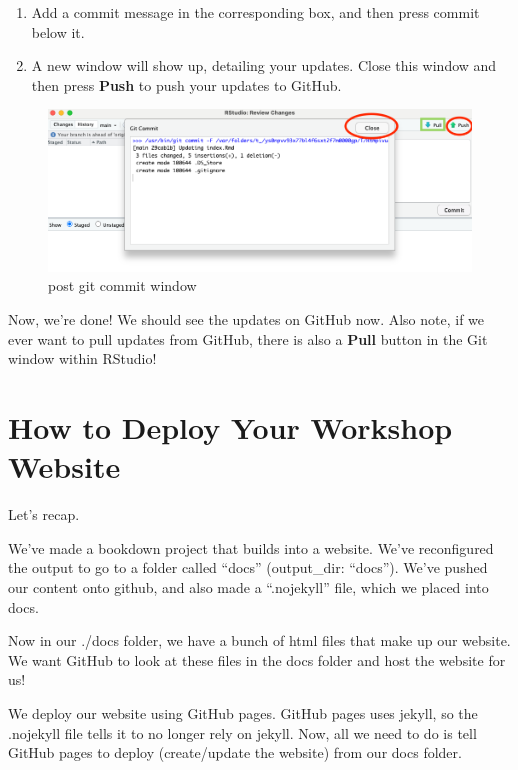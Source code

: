 \documentclass[
]{book}
\theoremstyle{definition}
\theoremstyle{definition}
\theoremstyle{definition}
\theoremstyle{definition}
\theoremstyle{remark}
\begin{document}
\begin{enumerate}
\def\labelenumi{\arabic{enumi}.}
\setcounter{enumi}{14}
\item
  Add a commit message in the corresponding box, and then press commit below it.
\item
  A new window will show up, detailing your updates. Close this window and then press \textbf{Push} to push your updates to GitHub.
\end{enumerate}

\begin{figure}
\centering
\includegraphics{img/git-instruct/git-window-post-commit.png}
\caption{post git commit window}
\end{figure}

Now, we're done! We should see the updates on GitHub now. Also note, if we ever want to pull updates from GitHub, there is also a \textbf{Pull} button in the Git window within RStudio!

\chapter{How to Deploy Your Workshop Website}\label{how-to-deploy-your-workshop-website}

Let's recap.

We've made a bookdown project that builds into a website. We've reconfigured the output to go to a folder called ``docs'' (output\_dir: ``docs''). We've pushed our content onto github, and also made a ``.nojekyll'' file, which we placed into docs.

Now in our ./docs folder, we have a bunch of html files that make up our website. We want GitHub to look at these files in the docs folder and host the website for us!

We deploy our website using GitHub pages. GitHub pages uses jekyll, so the .nojekyll file tells it to no longer rely on jekyll. Now, all we need to do is tell GitHub pages to deploy (create/update the website) from our docs folder.
\end{document}
